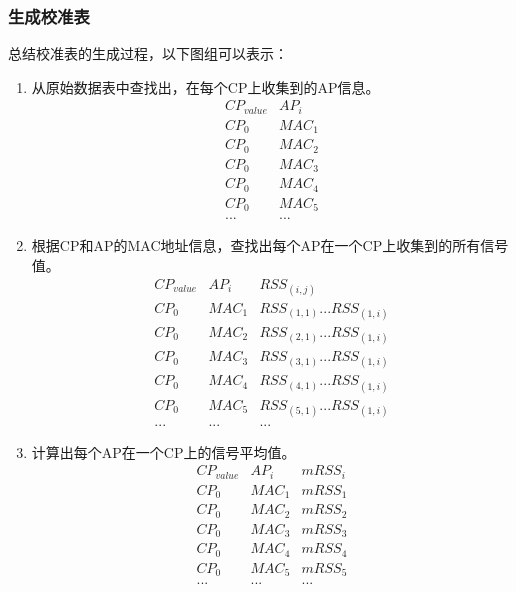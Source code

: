 \documentclass[UTF8, twocolumn ]{ctexart}
\begin{document}
\subsubsection{生成校准表}
总结校准表的生成过程，以下图组可以表示：

\begin{enumerate}
\item 从原始数据表中查找出，在每个CP上收集到的AP信息。
\begin{displaymath}
\begin{array}{c|c}
CP_{value} & AP_{i} \\ \hline
CP_{0} & MAC_{1} \\
CP_{0} & MAC_{2} \\
CP_{0} & MAC_{3} \\
CP_{0} & MAC_{4} \\
CP_{0} & MAC_{5} \\
... & ...
\end{array}
\end{displaymath}
\item 根据CP和AP的MAC地址信息，查找出每个AP在一个CP上收集到的所有信号值。
\begin{displaymath}
\begin{array}{c|c|c}
CP_{value} & AP_{i} & RSS_{(i,j)} \\ \hline
CP_{0} & MAC_{1} & RSS_{(1,1)}...RSS_{(1,i)} \\
CP_{0} & MAC_{2} & RSS_{(2,1)}...RSS_{(1,i)} \\
CP_{0} & MAC_{3} & RSS_{(3,1)}...RSS_{(1,i)} \\
CP_{0} & MAC_{4} & RSS_{(4,1)}...RSS_{(1,i)} \\
CP_{0} & MAC_{5} & RSS_{(5,1)}...RSS_{(1,i)} \\
... & ... & ...
\end{array}
\end{displaymath}
\item 计算出每个AP在一个CP上的信号平均值。
\begin{displaymath}
\begin{array}{c|c|c}
CP_{value} & AP_{i} & mRSS_{i} \\ \hline
CP_{0} & MAC_{1} & mRSS_{1} \\
CP_{0} & MAC_{2} & mRSS_{2} \\
CP_{0} & MAC_{3} & mRSS_{3} \\
CP_{0} & MAC_{4} & mRSS_{4} \\
CP_{0} & MAC_{5} & mRSS_{5} \\
... & ... & ...
\end{array}

\end{displaymath}
\end{enumerate}
\end{document}
